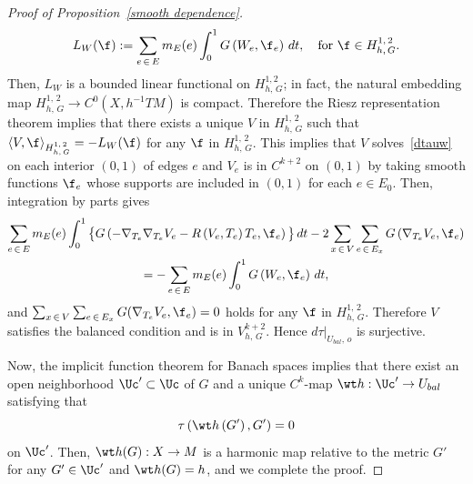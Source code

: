 \begin{proof}[Proof of Proposition~\ref{smooth dependence}]
\[
L_W(\f):=\sum_{e\,\in\,E}m_E(e)\int_0^1 G\left(W_e, \f_e\right)\,dt, \quad \text{for }\f \in H^{1,\,2}_{h,\,G}.
\]
Then, $L_W$ is a bounded linear functional on $H^{1, 2}_{h,\,G}$; in fact, the natural embedding map $H^{1,\,2}_{h,\,G} \to C^0(X, h^{-1}TM)$ is compact. Therefore the Riesz representation theorem implies that there exists a unique $V$ in $H^{1,\,2}_{h,\,G}$ such that $\langle V, \f\rangle_{H_{h,\,G}^{1,\,2}}=-L_W(\f)$ for any $\f$ in $H^{1,\,2}_{h,\,G}$. This implies that $V$ solves~\eqref{dtauw} on each interior $(0, 1)$ of edges $e$ and $V_e$ is in $C^{k+2}$ on $(0, 1)$ by taking smooth functions $\f_e$ whose supports are included in $(0, 1)$ for each $e \in E_0$. Then, integration by parts gives
\begin{multline*}
\sum_{e\,\in\,E}m_E(e)\int_0^1\big\{G\left(-\nabla_{T_e}\nabla_{T_e}V_e-R\left(V_e, T_e\right)T_e, \f_e\right)\big\}\,dt -2\sum_{x\,\in\,V}\sum_{e\,\in\,E_x}G\left(\nabla_{T_e}V_e, \f_e\right)\\
=-\sum_{e\,\in\,E}m_E(e)\int_0^1 G\left(W_e, \f_e\right)\,dt,
\end{multline*}
and $\sum_{x\,\in\,V}\sum_{e\,\in\,E_x}G(\nabla_{T_e}V_e, \f_e)=0$ holds for any $\f$ in $H^{1,\,2}_{h,\,G}$. Therefore $V$ satisfies the balanced condition and is in $V_{h,\,G}^{k+2}$. Hence $d\tau|_{U_{bal},\,o}$ is surjective.



Now, the implicit function theorem for Banach spaces implies that there exist an open neighborhood $\Uc'\subset \Uc$ of $G$ and a unique $C^k$-map $\wt h: \Uc'\to U_{bal}$ satisfying that
\[
\tau\left(\wt h\left(G'\right),G'\right)=0
\]
on $\Uc'$. Then, $\wt h(G): X\to M$ is a harmonic map relative to the metric $G'$ for any $G' \in \Uc'$ and $\wt h(G)=h$, and we complete the proof.
\end{proof}

